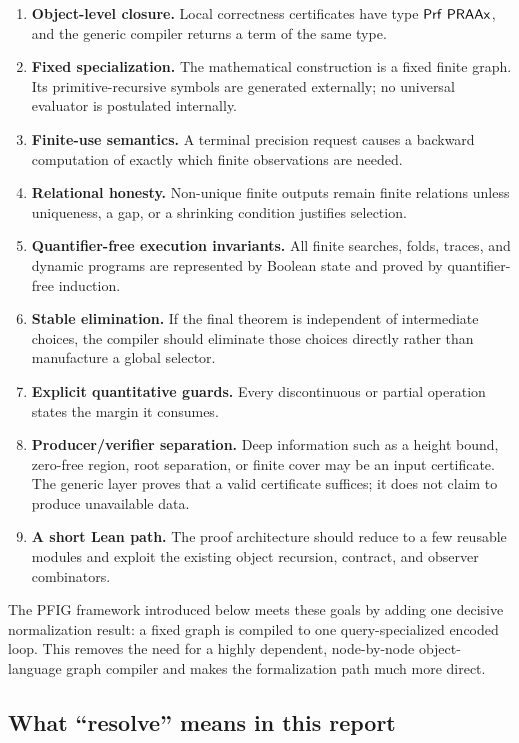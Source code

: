 \begin{enumerate}
\item \textbf{Object-level closure.}  Local correctness certificates have type \(\mathsf{Prf}\ \mathsf{PRAAx}\), and the generic compiler returns a term of the same type.
\item \textbf{Fixed specialization.}  The mathematical construction is a fixed finite graph.  Its primitive-recursive symbols are generated externally; no universal evaluator is postulated internally.
\item \textbf{Finite-use semantics.}  A terminal precision request causes a backward computation of exactly which finite observations are needed.
\item \textbf{Relational honesty.}  Non-unique finite outputs remain finite relations unless uniqueness, a gap, or a shrinking condition justifies selection.
\item \textbf{Quantifier-free execution invariants.}  All finite searches, folds, traces, and dynamic programs are represented by Boolean state and proved by quantifier-free induction.
\item \textbf{Stable elimination.}  If the final theorem is independent of intermediate choices, the compiler should eliminate those choices directly rather than manufacture a global selector.
\item \textbf{Explicit quantitative guards.}  Every discontinuous or partial operation states the margin it consumes.
\item \textbf{Producer/verifier separation.}  Deep information such as a height bound, zero-free region, root separation, or finite cover may be an input certificate.  The generic layer proves that a valid certificate suffices; it does not claim to produce unavailable data.
\item \textbf{A short Lean path.}  The proof architecture should reduce to a few reusable modules and exploit the existing object recursion, contract, and observer combinators.
\end{enumerate}

The PFIG framework introduced below meets these goals by adding one decisive normalization result: a fixed graph is compiled to one query-specialized encoded loop.  This removes the need for a highly dependent, node-by-node object-language graph compiler and makes the formalization path much more direct.

\subsection{What ``resolve'' means in this report}

